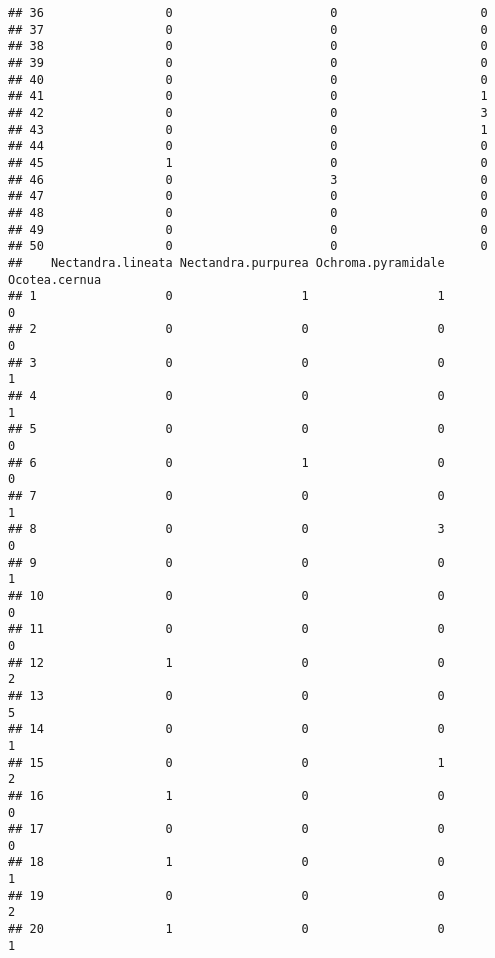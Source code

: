 \documentclass[
]{article}
\begin{document}
\begin{verbatim}
## 36                 0                      0                    0
## 37                 0                      0                    0
## 38                 0                      0                    0
## 39                 0                      0                    0
## 40                 0                      0                    0
## 41                 0                      0                    1
## 42                 0                      0                    3
## 43                 0                      0                    1
## 44                 0                      0                    0
## 45                 1                      0                    0
## 46                 0                      3                    0
## 47                 0                      0                    0
## 48                 0                      0                    0
## 49                 0                      0                    0
## 50                 0                      0                    0
##    Nectandra.lineata Nectandra.purpurea Ochroma.pyramidale Ocotea.cernua
## 1                  0                  1                  1             0
## 2                  0                  0                  0             0
## 3                  0                  0                  0             1
## 4                  0                  0                  0             1
## 5                  0                  0                  0             0
## 6                  0                  1                  0             0
## 7                  0                  0                  0             1
## 8                  0                  0                  3             0
## 9                  0                  0                  0             1
## 10                 0                  0                  0             0
## 11                 0                  0                  0             0
## 12                 1                  0                  0             2
## 13                 0                  0                  0             5
## 14                 0                  0                  0             1
## 15                 0                  0                  1             2
## 16                 1                  0                  0             0
## 17                 0                  0                  0             0
## 18                 1                  0                  0             1
## 19                 0                  0                  0             2
## 20                 1                  0                  0             1

\end{verbatim}
\end{document}
